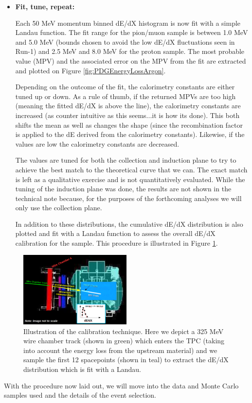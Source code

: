 \begin{itemize}
\item \textbf{Fit, tune, repeat:}

Each 50 MeV momentum binned dE/dX histogram is now fit with a simple Landau function. The fit range for the pion/muon sample is between 1.0 MeV and 5.0 MeV (bounds chosen to avoid the low dE/dX fluctuations seen in Run-1) and 2.5 MeV and 8.0 MeV for the proton sample. The most probable value (MPV) and the associated error on the MPV from the fit are extracted and plotted on Figure \ref{fig:PDGEnergyLossArgon}.

Depending on the outcome of the fit, the calorimetry constants are either tuned up or down. As a rule of thumb, if the returned MPVs are too high (meaning the fitted dE/dX is above the line), the calorimetry constants are increased (as counter intuitive as this seems...it is how its done). This both shifts the mean as well as changes the shape (since the recombination factor is applied to the dE derived from the calorimetry constants). Likewise, if the values are low the calorimetry constants are decreased. 

The values are tuned for both the collection and induction plane to try to achieve the best match to the theoretical curve that we can. The exact match is left as a qualitative exercise and is not quantitatively evaluated. While the tuning of the induction plane was done, the results are not shown in the technical note because, for the purposes of the forthcoming analyses we will only use the collection plane.

In addition to these distributions, the cumulative dE/dX distribution is also plotted and fit with a Landau function to assess the overall dE/dX calibration for the sample. This procedure is illustrated in Figure \ref{fig:CalibrationExample}.

\end{itemize}

\begin{figure}[htb]
\centering
\includegraphics[width=0.50\textwidth]{images/CalibrationExample.png}
\caption{Illustration of the calibration technique. Here we depict a 325 MeV wire chamber track (shown in green) which enters the TPC (taking into account the energy loss from the upstream material) and we sample the first 12 spacepoints (shown in teal) to extract the dE/dX distribution which is fit with a Landau.}
\label{fig:CalibrationExample}
\end{figure}

With the procedure now laid out, we will move into the data and Monte Carlo samples used and the details of the event selection.
